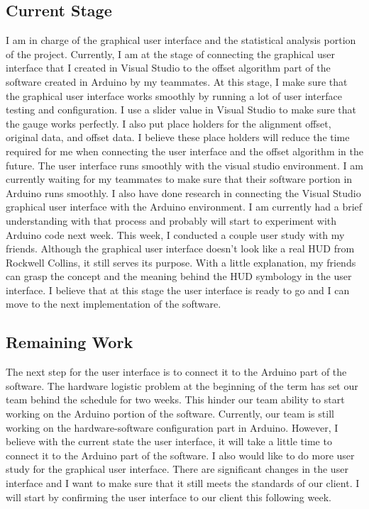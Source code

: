 \subsection{Current Stage}
I am in charge of the graphical user interface and the statistical analysis portion of the project. Currently, I am at the stage of connecting the graphical user interface that I created in Visual Studio to the offset algorithm part of the software created in Arduino by my teammates. At this stage, I make sure that the graphical user interface works smoothly by running a lot of user interface testing and configuration. I use a slider value in Visual Studio to make sure that the gauge works perfectly. I also put place holders for the alignment offset, original data, and offset data. I believe these place holders will reduce the time required for me when connecting the user interface and the offset algorithm in the future. The user interface runs smoothly with the visual studio environment. I am currently waiting for my teammates to make sure that their software portion in Arduino runs smoothly. I also have done research in connecting the Visual Studio graphical user interface with the Arduino environment. I am currently had a brief understanding with that process and probably will start to experiment with Arduino code next week. This week, I conducted a couple user study with my friends. Although the graphical user interface doesn’t look like a real HUD from Rockwell Collins, it still serves its purpose. With a little explanation, my friends can grasp the concept and the meaning behind the HUD symbology in the user interface. I believe that at this stage the user interface is ready to go and I can move to the next implementation of the software. 

\subsection{Remaining Work}
The next step for the user interface is to connect it to the Arduino part of the software. The hardware logistic problem at the beginning of the term has set our team behind the schedule for two weeks. This hinder our team ability to start working on the Arduino portion of the software. Currently, our team is still working on the hardware-software configuration part in Arduino. However, I believe with the current state the user interface, it will take a little time to connect it to the Arduino part of the software. I also would like to do more user study for the graphical user interface. There are significant changes in the user interface and I want to make sure that it still meets the standards of our client. I will start by confirming the user interface to our client this following week.

